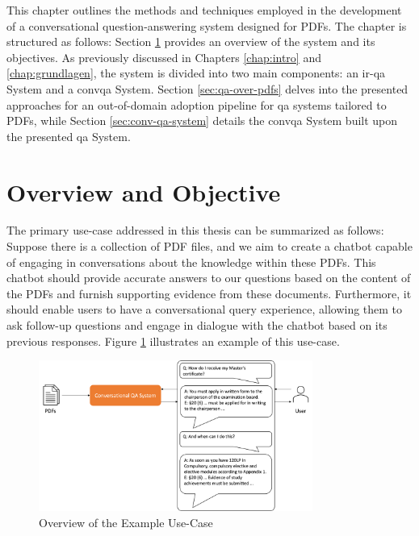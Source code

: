 This chapter outlines the methods and techniques employed in the development of a conversational question-answering system designed for PDFs. The chapter is structured as follows: Section \ref{sec:overview} provides an overview of the system and its objectives. As previously discussed in Chapters \ref{chap:intro} and \ref{chap:grundlagen}, the system is divided into two main components: an \gls{ir}-\gls{qa} System and a \gls{convqa} System. Section \ref{sec:qa-over-pdfs} delves into the presented approaches for an out-of-domain adoption pipeline for \gls{qa} systems tailored to PDFs, while Section \ref{sec:conv-qa-system} details the \gls{convqa} System built upon the presented \gls{qa} System.

\section{Overview and Objective}
\label{sec:overview}

The primary use-case addressed in this thesis can be summarized as follows: Suppose there is a collection of PDF files, and we aim to create a chatbot capable of engaging in conversations about the knowledge within these PDFs. This chatbot should provide accurate answers to our questions based on the content of the PDFs and furnish supporting evidence from these documents. Furthermore, it should enable users to have a conversational query experience, allowing them to ask follow-up questions and engage in dialogue with the chatbot based on its previous responses. Figure \ref{fig:use-case} illustrates an example of this use-case.

\begin{figure}
    \centering
    \includegraphics[width=0.8\textwidth]{Grafiken/Use_Case.png}
    \caption{Overview of the Example Use-Case}
    \label{fig:use-case}
\end{figure}

